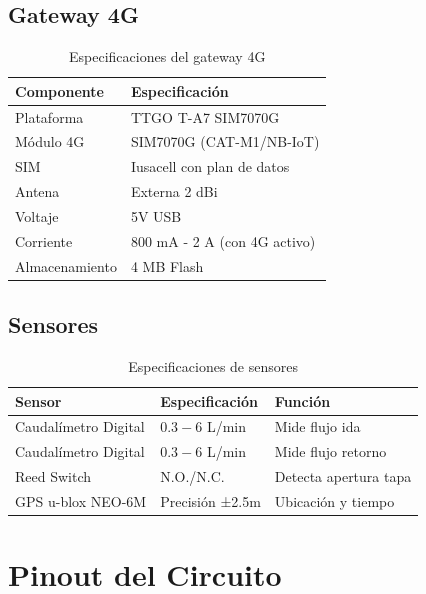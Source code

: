 \documentclass[12pt,a4paper,oneside]{report}
\begin{document}
\subsection{Gateway 4G}

\begin{table}[H]
    \centering
    \begin{tabular}{|l|l|}
        \hline
        \textbf{Componente} & \textbf{Especificación} \\
        \hline
        Plataforma & TTGO T-A7 SIM7070G \\
        Módulo 4G & SIM7070G (CAT-M1/NB-IoT) \\
        SIM & Iusacell con plan de datos \\
        Antena & Externa 2 dBi \\
        Voltaje & 5V USB \\
        Corriente & 800 mA - 2 A (con 4G activo) \\
        Almacenamiento & 4 MB Flash \\
        \hline
    \end{tabular}
    \caption{Especificaciones del gateway 4G}
\end{table}

\subsection{Sensores}

\begin{table}[H]
    \centering
    \begin{tabular}{|l|l|l|}
        \hline
        \textbf{Sensor} & \textbf{Especificación} & \textbf{Función} \\
        \hline
        Caudalímetro Digital & $0.3-6$ L/min & Mide flujo ida \\
        Caudalímetro Digital & $0.3-6$ L/min & Mide flujo retorno \\
        Reed Switch & N.O./N.C. & Detecta apertura tapa \\
        GPS u-blox NEO-6M & Precisión ±2.5m & Ubicación y tiempo \\
        \hline
    \end{tabular}
    \caption{Especificaciones de sensores}
\end{table}

\section{Pinout del Circuito}
\end{document}
